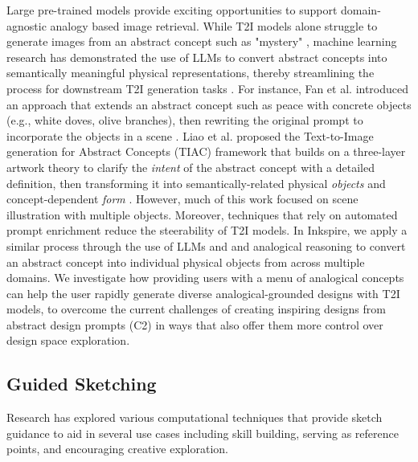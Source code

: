 \documentclass[sigconf, screen]{acmart}
\begin{document}
Large pre-trained models provide exciting opportunities to support domain-agnostic analogy based image retrieval. While T2I models alone struggle to generate images from an abstract concept such as "mystery" \cite{khaliq2024comparison}, machine learning research has demonstrated the use of LLMs to convert abstract concepts into semantically meaningful physical representations, thereby streamlining the process for downstream T2I generation tasks \cite{liao2024text,fan2024prompt,wu2024imagine}. For instance, Fan et al. introduced an approach that extends an abstract concept such as peace with concrete objects (e.g., white doves, olive branches), then rewriting the original prompt to incorporate the objects in a scene \cite{fan2024prompt}. Liao et al. proposed the Text-to-Image generation for Abstract Concepts (TIAC) framework that builds on a three-layer artwork theory to clarify the \textit{intent} of the abstract concept with a detailed definition, then transforming it into semantically-related physical \textit{objects} and concept-dependent \textit{form} \cite{liao2024text}. However, much of this work focused on scene illustration with multiple objects. Moreover, techniques that rely on automated prompt enrichment reduce the steerability of T2I models. In Inkspire, we apply a similar process through the use of LLMs and and analogical reasoning to convert an abstract concept into individual physical objects from across multiple domains. We investigate how providing users with a menu of analogical concepts can help the user rapidly generate diverse analogical-grounded designs with T2I models, to overcome the current challenges of creating inspiring designs from abstract design prompts (C2) in ways that also offer them more control over design space exploration.


\subsection{Guided Sketching}
Research has explored various computational techniques that provide sketch guidance to aid in several use cases including skill building, serving as reference points, and encouraging creative exploration.
\end{document}
